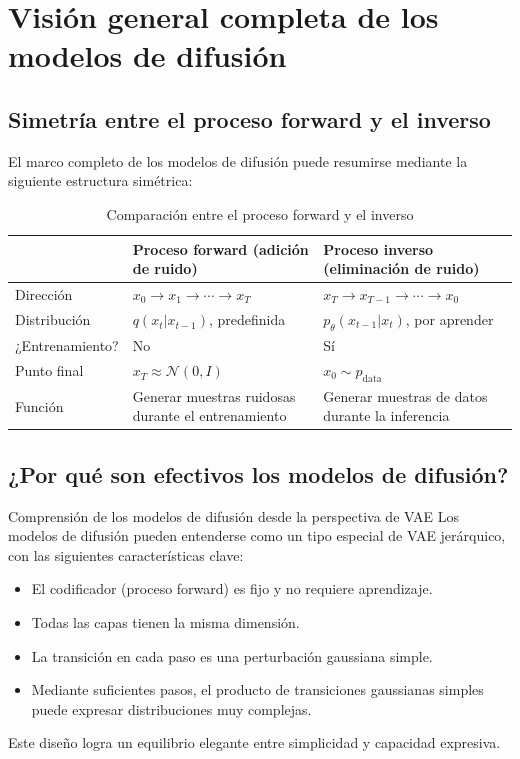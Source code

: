 \section{Visión general completa de los modelos de difusión}

\subsection{Simetría entre el proceso forward y el inverso}

El marco completo de los modelos de difusión puede resumirse mediante la siguiente estructura simétrica:

\begin{table}[H]
\centering
\begin{tabular}{lll}
\toprule
 & \textbf{Proceso forward (adición de ruido)} & \textbf{Proceso inverso (eliminación de ruido)} \\
\midrule
Dirección & $x_0 \to x_1 \to \cdots \to x_T$ & $x_T \to x_{T-1} \to \cdots \to x_0$ \\
Distribución & $q(x_t | x_{t-1})$, predefinida & $p_\theta(x_{t-1} | x_t)$, por aprender \\
¿Entrenamiento? & No & Sí \\
Punto final & $x_T \approx \mathcal{N}(0, I)$ & $x_0 \sim p_{\text{data}}$ \\
Función & Generar muestras ruidosas durante el entrenamiento & Generar muestras de datos durante la inferencia \\
\bottomrule
\end{tabular}
\caption{Comparación entre el proceso forward y el inverso}
\end{table}

\subsection{¿Por qué son efectivos los modelos de difusión?}

\begin{knowledgebox}{Comprensión de los modelos de difusión desde la perspectiva de VAE}
Los modelos de difusión pueden entenderse como un tipo especial de VAE jerárquico, con las siguientes características clave:
\begin{itemize}
    \item El codificador (proceso forward) es fijo y no requiere aprendizaje.
    \item Todas las capas tienen la misma dimensión.
    \item La transición en cada paso es una perturbación gaussiana simple.
    \item Mediante suficientes pasos, el producto de transiciones gaussianas simples puede expresar distribuciones muy complejas.
\end{itemize}
Este diseño logra un equilibrio elegante entre simplicidad y capacidad expresiva.
\end{knowledgebox}

